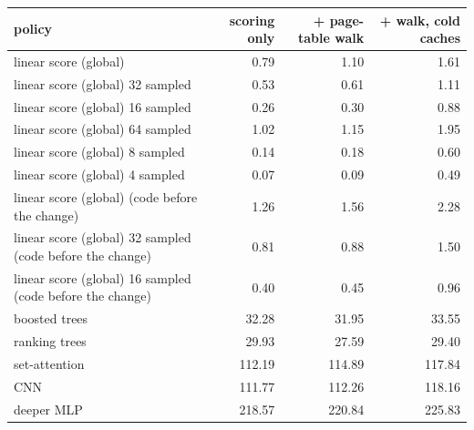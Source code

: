 \begin{tabular}{lrrr}
\toprule
policy & scoring only & + page-table walk & + walk, cold caches \\
\midrule
linear score (global) & 0.79 & 1.10 & 1.61 \\
linear score (global) 32 sampled & 0.53 & 0.61 & 1.11 \\
linear score (global) 16 sampled & 0.26 & 0.30 & 0.88 \\
linear score (global) 64 sampled & 1.02 & 1.15 & 1.95 \\
linear score (global) 8 sampled & 0.14 & 0.18 & 0.60 \\
linear score (global) 4 sampled & 0.07 & 0.09 & 0.49 \\
linear score (global) (code before the change) & 1.26 & 1.56 & 2.28 \\
linear score (global) 32 sampled (code before the change) & 0.81 & 0.88 & 1.50 \\
linear score (global) 16 sampled (code before the change) & 0.40 & 0.45 & 0.96 \\
boosted trees & 32.28 & 31.95 & 33.55 \\
ranking trees & 29.93 & 27.59 & 29.40 \\
set-attention & 112.19 & 114.89 & 117.84 \\
CNN & 111.77 & 112.26 & 118.16 \\
deeper MLP & 218.57 & 220.84 & 225.83 \\
\bottomrule
\end{tabular}
